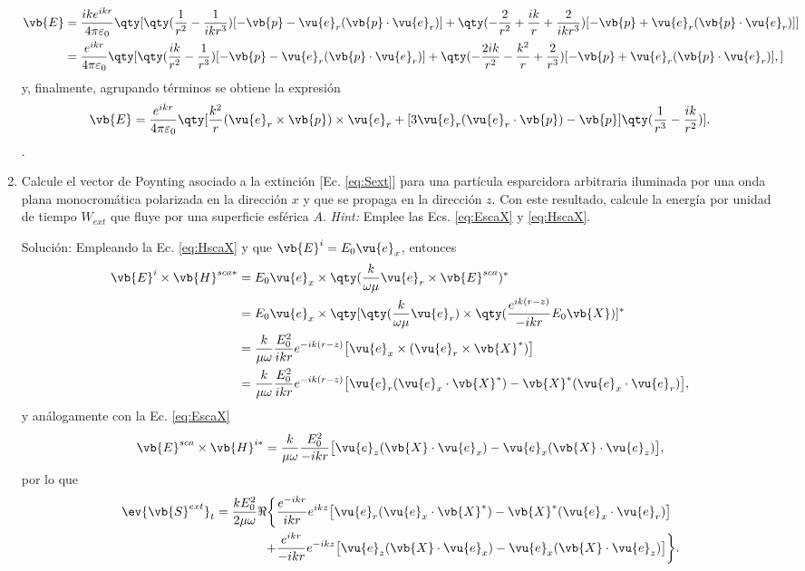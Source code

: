 \begin{enumerate}[label=\textbf{Ejercicio \thechapter.\arabic*},resume]
\begin{align*}
\vb{E} &= \frac{ik e^{ikr}}{4\pi\varepsilon_0}\qty[
	\qty(\frac{1}{r^2}-\frac{1}{ikr^3})[-\vb{p}-\vu{e}_r(\vb{p}\cdot\vu{e}_r)] + 
	\qty(-\frac{2}{r^2}+\frac{ik}{r}+\frac{2}{ikr^3})[-\vb{p}+\vu{e}_r(\vb{p}\cdot\vu{e}_r)]
]\\
	&=  \frac{e^{ikr}}{4\pi\varepsilon_0}\qty[
	\qty(\frac{ik}{r^2}-\frac{1}{r^3})[-\vb{p}-\vu{e}_r(\vb{p}\cdot\vu{e}_r)] + 
	\qty(-\frac{2ik}{r^2}-\frac{k^2}{r}+\frac{2}{r^3})[-\vb{p}+\vu{e}_r(\vb{p}\cdot\vu{e}_r)],
]
\end{align*}
%
y, finalmente, agrupando términos se obtiene la expresión
%
\begin{align*}
\vb{E} = \frac{e^{ikr}}{4\pi\varepsilon_0}\qty[
	\frac{k^2}{r}(\vu{e}_r\times\vb{p})\times\vu{e}_r + 
	[3\vu{e}_r(\vu{e}_r\cdot\vb{p})-\vb{p}]\qty(\frac{1}{r^3}-\frac{ik}{r^2})
].
\end{align*}.
%

\item Calcule el vector de Poynting asociado a la extinción [Ec. \eqref{eq:Sext}] para una partícula esparcidora arbitraria iluminada por una onda plana monocromática polarizada en la dirección $x$ y que se propaga en la dirección $z$. Con este resultado, calcule la energía por unidad de tiempo $W_{ext}$ que fluye por una superficie esférica $A$.
\textit{Hint:} Emplee las Ecs. \eqref{eq:EscaX} y \eqref{eq:HscaX}.
\label{ex:Wext}
\item[\color{blue} Solución:]
Empleando la Ec. \eqref{eq:HscaX} y que $\vb{E}^i = E_0\vu{e}_x$, entonces
%
\begin{align*}
\vb{E}^i\times\vb{H}^{sca*} &= E_0\vu{e}_x\times\qty(\frac{k}{\omega\mu}\vu{e}_r\times\vb{E}^{sca})^*\\
	&= E_0 \vu{e}_x\times\qty[\qty(\frac{k}{\omega\mu}\vu{e}_r)\times\qty(\frac{e^{ik(r-z)}}{-ikr}E_0\vb{X})]^*\\
	&= \frac{k}{\mu\omega}\frac{E_0^2}{ikr}e^{-ik(r-z)}\big[\vu{e}_x\times(\vu{e}_r\times\vb{X}^*)\big]\\
&= \frac{k}{\mu\omega}\frac{E_0^2}{ikr}e^{-ik(r-z)}
	\big[
	\vu{e}_r(\vu{e}_x\cdot\vb{X}^*)-\vb{X}^*(\vu{e}_x\cdot\vu{e}_r)\big],
\end{align*}
%
y análogamente con la Ec. \eqref{eq:EscaX}
%
\begin{align*}
\vb{E}^{sca}\times\vb{H}^{i*} = \frac{k}{\mu\omega} \frac{E_0^2}{-ikr}\big[
	\vu{e}_z(\vb{X}\cdot\vu{e}_x)-\vu{e}_x(\vb{X}\cdot\vu{e}_z)\big],
\end{align*}
%
por lo que
%
\begin{align*}
\ev{\vb{S}^{ext}}_t = \frac{kE_0^2}{2\mu\omega}\Re\bigg\{&
\frac{e^{-ikr}}{ikr}e^{ikz}
	\big[
	\vu{e}_r(\vu{e}_x\cdot\vb{X}^*)-\vb{X}^*(\vu{e}_x\cdot\vu{e}_r)		
	\big]\\
+&
\frac{e^{ikr}}{-ikr}e^{-ikz}
	\big[
	\vu{e}_z(\vb{X}\cdot\vu{e}_x)-\vu{e}_x(\vb{X}\cdot\vu{e}_z)
	\big]
\bigg\}.
\end{align*}
%


\end{enumerate}
